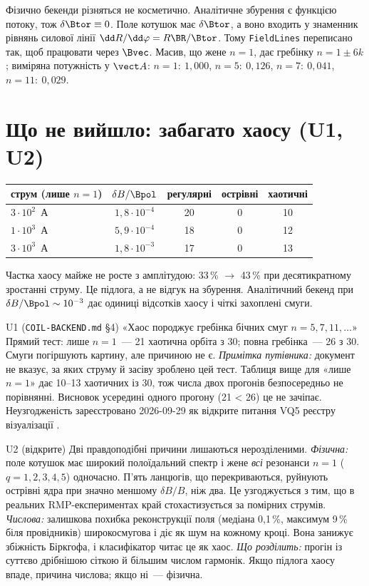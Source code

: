 Фізично бекенди різняться не косметично. Аналітичне збурення є функцією потоку, тож
$\delta\Btor\equiv0$. Поле котушок має $\delta\Btor$, а воно входить у знаменник рівнянь силової
лінії $\dd R/\dd\varphi=R\BR/\Btor$. Тому \texttt{FieldLines} переписано так, щоб працювати через
$\Bvec$. Масив, що жене $n=1$, дає гребінку $n=1\pm6k$; виміряна потужність у $\vect A$:
$n=1{:}\ 1{,}000$, $n=5{:}\ 0{,}126$, $n=7{:}\ 0{,}041$, $n=11{:}\ 0{,}029$.

\section{Що не вийшло: забагато хаосу (U1, U2)}\label{sec:g09-open}

\begin{center}\small
\begin{tabular}{@{}lcccc@{}}
\toprule
струм (лише $n=1$) & $\delta B/\Bpol$ & регулярні & острівні & хаотичні\\
\midrule
$3\cdot10^2$~А & $1{,}8\cdot10^{-4}$ & 20 & 0 & 10\\
$1\cdot10^3$~А & $5{,}9\cdot10^{-4}$ & 18 & 0 & 12\\
$3\cdot10^3$~А & $1{,}8\cdot10^{-3}$ & 17 & 0 & 13\\
\bottomrule
\end{tabular}
\end{center}
Частка хаосу майже не росте з амплітудою: 33\,\% $\to$ 43\,\% при десятикратному зростанні струму.
Це підлога, а не відгук на збурення. Аналітичний бекенд при $\delta B/\Bpol\sim10^{-3}$ дає
одиниці відсотків хаосу і чіткі захоплені смуги.

\begin{refuted}{U1 (\texttt{COIL-BACKEND.md} §4)}
«Хаос породжує гребінка бічних смуг $n=5,7,11,\ldots$» Прямий тест: лише $n=1$~--- 21 хаотична
орбіта з 30; повна гребінка~--- 26 з 30. Смуги погіршують картину, але причиною не є.
\emph{Примітка путівника:} документ не вказує, за яких струму й засіву зроблено цей тест. Таблиця
вище для «лише $n=1$» дає 10--13 хаотичних із 30, тож числа двох прогонів безпосередньо не
порівнянні. Висновок усередині одного прогону (21 < 26) це не зачіпає. Неузгодженість зареєстровано
2026-09-29 як відкрите питання VQ5 реєстру візуалізації \cite{RegViz}.
\end{refuted}

\begin{conjecture}{U2 (відкрите)}
Дві правдоподібні причини лишаються нерозділеними.
\emph{Фізична:} поле котушок має широкий полоїдальний спектр і жене \emph{всі} резонанси $n=1$
($q=1,2,3,4,5$) одночасно. П'ять ланцюгів, що перекриваються, руйнують острівні ядра при
значно меншому $\delta B/B$, ніж два. Це узгоджується з тим, що в реальних RMP-експериментах
край стохастизується за помірних струмів.
\emph{Числова:} залишкова похибка реконструкції поля (медіана 0,1\,\%, максимум 9\,\% біля
провідників) широкосмугова і діє як шум на кожному кроці. Вона занижує збіжність Біркгофа, і
класифікатор читає це як хаос.
\emph{Що розділить:} прогін із суттєво дрібнішою сіткою й більшим числом гармонік. Якщо підлога
хаосу впаде, причина числова; якщо ні~--- фізична.
\end{conjecture}

